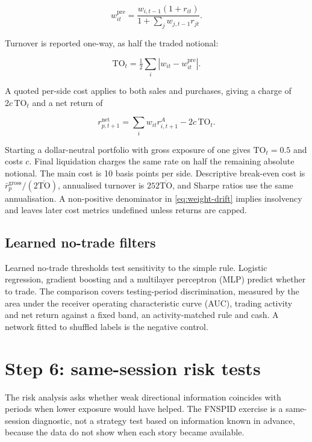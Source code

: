 \begin{equation}
 w^{\mathrm{pre}}_{it}=
 \frac{w_{i,t-1}(1+r_{it})}
 {1+\sum_j w_{j,t-1}r_{jt}}.
 \label{eq:weight-drift}
\end{equation}

Turnover is reported one-way, as half the traded notional:

\begin{equation}
 \mathrm{TO}_t=\tfrac{1}{2}\sum_i\left|w_{it}-w^{\mathrm{pre}}_{it}\right|.
 \label{eq:turnover}
\end{equation}

A quoted per-side cost applies to both sales and purchases, giving a charge of
$2c\,\mathrm{TO}_t$ and a net return of

\begin{equation}
 r^{\mathrm{net}}_{p,t+1}=\sum_i w_{it}r^A_{i,t+1}-2c\,\mathrm{TO}_t.
 \label{eq:portfolio-net}
\end{equation}

Starting a dollar-neutral portfolio with gross exposure of one gives
$\mathrm{TO}_t=0.5$ and costs $c$. Final liquidation charges the same rate on
half the remaining absolute notional. The main cost is 10 basis points per side.
Descriptive break-even cost is
$\bar r^{\mathrm{gross}}_p/(2\overline{\mathrm{TO}})$, annualised turnover is
$252\overline{\mathrm{TO}}$, and Sharpe ratios use the same annualisation. A
non-positive denominator in \cref{eq:weight-drift} implies insolvency and leaves
later cost metrics undefined unless returns are capped.

\subsection{Learned no-trade filters}

Learned no-trade thresholds test sensitivity to the simple rule. Logistic
regression, gradient boosting and a multilayer perceptron (MLP) predict whether
to trade. The comparison covers testing-period discrimination, measured by the
area under the receiver operating characteristic curve (AUC), trading activity
and net return against a fixed band, an activity-matched rule and cash. A network
fitted to shuffled labels is the negative control.

\section{Step 6: same-session risk tests}

The risk analysis asks whether weak directional information coincides with
periods when lower exposure would have helped. The FNSPID exercise is a
same-session diagnostic, not a strategy test based on information known in
advance, because the data do not show when each story became available.


